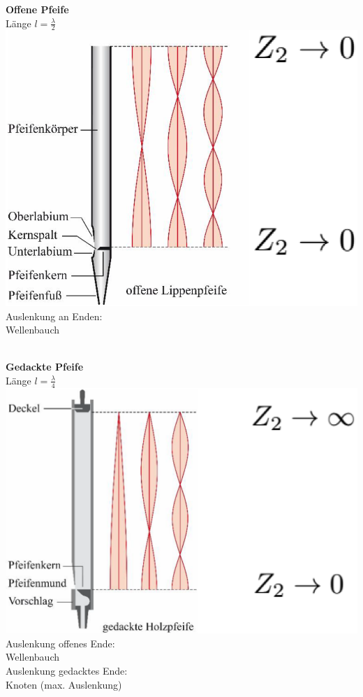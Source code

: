 \begin{minipage}{0.48\linewidth}
\textbf{Offene Pfeife}\\
Länge $l = \frac{\lambda}{2}$ \\

\includegraphics[width=0.85\linewidth]{Bilder/Wellen-Optik/offene_pfeiffe}\\

Auslenkung an Enden: \\
Wellenbauch \\
\\
\end{minipage}
\hfill
\begin{minipage}{0.48\linewidth}
\textbf{Gedackte Pfeife} \\
Länge $l = \frac{\lambda}{4}$ \\

\includegraphics[width=0.9\linewidth]{Bilder/Wellen-Optik/gedackte_pfeiffe} \\

Auslenkung offenes Ende: \\
Wellenbauch \\
Auslenkung gedacktes Ende:\\
Knoten  (max. Auslenkung)
\end{minipage}


